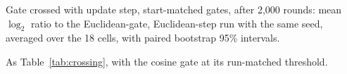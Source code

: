 \documentclass[11pt]{article}
\begin{document}
\begin{table}[h]
\centering\small
\caption{Gate crossed with update step, start-matched gates, after 2{,}000 rounds: mean $\log_2$ ratio to the Euclidean-gate, Euclidean-step run with the same seed, averaged over the 18 cells, with paired bootstrap 95\% intervals.}
\label{tab:crossing}

\end{table}

\begin{table}[h]
\centering\small
\caption{As Table~\ref{tab:crossing}, with the cosine gate at its run-matched threshold.}
\label{tab:crossing-run}

\end{table}
\end{document}
